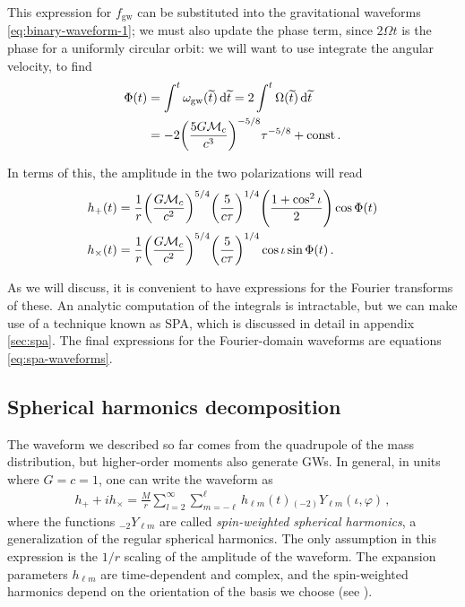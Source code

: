 \documentclass[main.tex]{subfiles}
\begin{document}

This expression for \(f _{\text{gw}}\) can be substituted into the gravitational waveforms \eqref{eq:binary-waveform-1}; we must also update the phase term, since \(2 \Omega t\) is the phase for a uniformly circular orbit: we will want to use integrate the angular velocity, to find 
%
\begin{align} \label{eq:phase-quadrupole-emission}
\Phi (t) &= \int^{t} \omega _{\text{gw}}(\widetilde{t}) \dd{\widetilde{t}} = 2 \int^{t} \Omega (\widetilde{t}) \dd{\widetilde{t}}  \\
&= -2 \qty(\frac{5 G \mathcal{M}_c}{c^3})^{-5/8} \tau^{-5/8} + \mathrm{const}
\,.
\end{align}

In terms of this, the amplitude in the two polarizations will read \cite[eqs.\ 4.31--32]{maggioreGravitationalWavesVolume2007}
%
\begin{align} \label{eq:amplitude-quadrupole-emission}
h_{+} (t) &= \frac{1}{r} \qty(\frac{G \mathcal{M}_c}{c^2})^{5/4} \qty( \frac{5}{c \tau })^{1/4} \qty(\frac{1 + \cos^2\iota }{2}) \cos \Phi (t) \\
h_{ \times } (t) &= \frac{1}{r} \qty(\frac{G \mathcal{M}_c}{c^2})^{5/4} \qty( \frac{5}{c \tau })^{1/4} \cos \iota  \sin \Phi (t) 
\,.
\end{align}

As we will discuss, it is convenient to have expressions for the Fourier transforms of these. An analytic computation of the integrals is intractable, but we can make use of a technique known as \ac{SPA}, which is discussed in detail in appendix \ref{sec:spa}. 
The final expressions for the Fourier-domain waveforms are equations \eqref{eq:spa-waveforms}. 

\subsection{Spherical harmonics decomposition}

The waveform we described so far comes from the quadrupole of the mass distribution, but higher-order moments also generate \acp{GW}.
In general, in units where \(G = c = 1\), one can write the waveform as \cite[eq.\ II.6]{ajithDataFormatsNumerical2011}
%
\begin{align}
h_+ + i h_\times = \frac{M}{r} \sum _{l=2}^{\infty } \sum _{m=-\ell}^{\ell} h_{\ell m} (t) {}_{(-2)}Y_{\ell m} (\iota, \varphi )
\,,
\end{align}
%
where the functions \({}_{-2}Y_{\ell m}\) are called \emph{spin-weighted spherical harmonics}, a generalization of the regular spherical harmonics. 
The only assumption in this expression is the \(1/r\) scaling of the amplitude of the waveform. 
The expansion parameters \(h_{\ell m}\) are time-dependent and complex, and the spin-weighted harmonics depend on the orientation of the basis we choose (see ).
\end{document}
